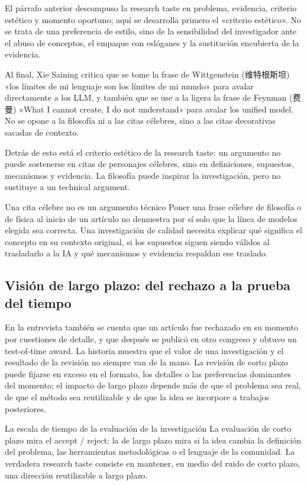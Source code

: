 \documentclass[a4paper]{article}
\begin{document}
El párrafo anterior descompuso la research taste en problema, evidencia, criterio estético y momento oportuno; aquí se desarrolla primero el «criterio estético». No se trata de una preferencia de estilo, sino de la sensibilidad del investigador ante el abuso de conceptos, el empaque con eslóganes y la sustitución encubierta de la evidencia.

Al final, Xie Saining critica que se tome la frase de Wittgenstein (维特根斯坦) «los límites de mi lenguaje son los límites de mi mundo» para avalar directamente a los LLM, y también que se use a la ligera la frase de Feynman (费曼) «What I cannot create, I do not understand» para avalar los unified model. No se opone a la filosofía ni a las citas célebres, sino a las citas decorativas sacadas de contexto.

Detrás de esto está el criterio estético de la research taste: un argumento no puede sostenerse en citas de personajes célebres, sino en definiciones, supuestos, mecanismos y evidencia. La filosofía puede inspirar la investigación, pero no sustituye a un technical argument.

\begin{warningbox}{Una cita célebre no es un argumento técnico}
Poner una frase célebre de filosofía o de física al inicio de un artículo no demuestra por sí solo que la línea de modelos elegida sea correcta. Una investigación de calidad necesita explicar qué significa el concepto en su contexto original, si los supuestos siguen siendo válidos al trasladarlo a la IA y qué mecanismos y evidencia respaldan ese traslado.
\end{warningbox}

\subsection{Visión de largo plazo: del rechazo a la prueba del tiempo}

En la entrevista también se cuenta que un artículo fue rechazado en su momento por cuestiones de detalle, y que después se publicó en otro congreso y obtuvo un test-of-time award. La historia muestra que el valor de una investigación y el resultado de la revisión no siempre van de la mano. La revisión de corto plazo puede fijarse en exceso en el formato, los detalles o las preferencias dominantes del momento; el impacto de largo plazo depende más de que el problema sea real, de que el método sea reutilizable y de que la idea se incorpore a trabajos posteriores.

\begin{importantbox}{La escala de tiempo de la evaluación de la investigación}
La evaluación de corto plazo mira el accept / reject; la de largo plazo mira si la idea cambia la definición del problema, las herramientas metodológicas o el lenguaje de la comunidad. La verdadera research taste consiste en mantener, en medio del ruido de corto plazo, una dirección reutilizable a largo plazo.
\end{importantbox}
\end{document}
